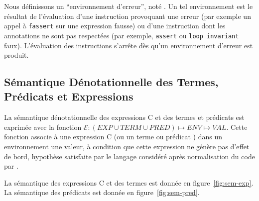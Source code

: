 Nous définissons un ``environnement d'erreur'', noté \errorenv.
Un tel environnement est le résultat de l'évaluation d'une instruction
provoquant une erreur (par exemple un appel à \lstinline'fassert' sur une
expression fausse) ou d'une instruction dont les annotations ne sont pas
respectées (par exemple, \lstinline'assert' ou \lstinline'loop invariant' faux).
L'évaluation des instructions s'arrête dès qu'un environnement d'erreur est
produit.


\subsection{Sémantique Dénotationnelle des Termes, Prédicats et Expressions}

La sémantique dénotationnelle des expressions C et des termes et prédicats
\eacsl est exprimée avec la fonction
$\mathcal{E} : (EXP \cup TERM \cup PRED) \mapsto ENV \mapsto VAL$.
Cette fonction associe à une expression C (ou un terme ou prédicat \eacsl) dans
un environnement une valeur, à condition que cette expression ne génère pas
d'effet de bord, hypothèse satisfaite par le langage considéré après
normalisation du code par \framac.

La sémantique des expressions C et des termes \eacsl est donnée en
figure~\ref{fig:sem-exp}.
La sémantique des prédicats \eacsl est donnée en figure~\ref{fig:sem-pred}.

